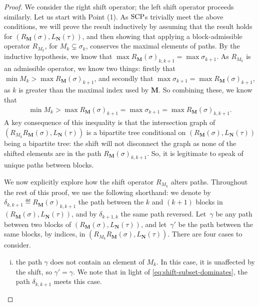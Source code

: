 \begin{proof}
We consider the right shift operator; the left shift operator proceeds similarly.
Let us start with Point (1).
As $\mathrm{SCP}$s trivially meet the above conditions, we will prove the result inductively by assuming that the result holds for $(R_{\mathbf{M}}(\sigma),L_{\mathbf{N}}(\tau))$, and then showing that applying a block-admissible operator $R_{M_k}$, for $M_k\subsetneq \sigma_k$,
conserves the maximal elements of paths.
By the inductive hypothesis, we know that $\max R_{\mathbf{M}}(\sigma)_{k,k+1}= \max \sigma_{k+1}$.
As $R_{M_k}$ is an admissible operator, we know two things: firstly that $\min M_k > \max R_{\mathbf{M}}(\sigma)_{k+1}$, and secondly that $\max \sigma_{k+1} = \max R_{\mathbf{M}}(\sigma)_{k+1}$, as $k$ is greater than the maximal index used by $\mathbf{M}$.
So combining these, we know that
\begin{align}
\label{eq:shift-subset-dominates}
\min M_k > \max R_{\mathbf{M}}(\sigma)_{k+1} = \max \sigma_{k+1} = \max R_{\mathbf{M}}(\sigma)_{k,k+1} .  \tag{W}
\end{align}
A key consequence of this inequality is that the intersection graph of $(R_{M_k}R_{\mathbf{M}}(\sigma),L_{\mathbf{N}}(\tau))$ is a bipartite tree conditional on $(R_{\mathbf{M}}(\sigma),L_{\mathbf{N}}(\tau))$ being a bipartite tree: the shift will not disconnect the graph as none of the shifted elements are in the path $R_{\mathbf{M}}(\sigma)_{k,k+1}$. 
So, it is legitimate to speak of unique paths between blocks. 

We now explicitly explore how the shift operator $R_{M_k}$ alters paths. 
Throughout the rest of this proof, we use the following shorthand: we denote by $\delta_{k,k+1} \eqdef  R_{\mathbf{M}}(\sigma)_{k,k+1}$ the path between the $k$\ordinal{} and $(k+1)$\ordinalst{} blocks in $(R_{\mathbf{M}}(\sigma),L_{\mathbf{N}}(\tau))$, and by $\delta_{k+1,k}$ the same path reversed.
Let~$\gamma$ be any path between two blocks of $(R_{\mathbf{M}}(\sigma),L_{\mathbf{N}}(\tau))$, and let~$\gamma'$ be the path between the same blocks, by indices, in $(R_{M_k}R_{\mathbf{M}}(\sigma),L_{\mathbf{N}}(\tau))$. 
There are four cases to consider. 
\begin{enumerate}[i)]
\item the path $\gamma$ does not contain an element of $M_k$.
In this case, it is unaffected by the shift, so $\gamma' = \gamma$.
We note that in light of \cref{eq:shift-subset-dominates}, the path $\delta_{k,k+1}$ meets this case.


\end{enumerate}
\end{proof}
